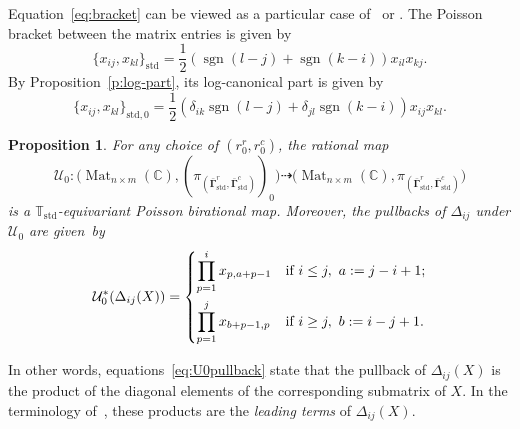 \documentclass[11pt]{article}
\newcommand{\bbg}{\bar{\mathbf{\Gamma}}}
\newcommand{\std}{\mathrm{std}}
\DeclareMathOperator{\Mat}{Mat}
\DeclareMathOperator{\sgn}{sgn}
\newtheorem{proposition}[theorem]{Proposition}%
\theoremstyle{definition}\newtheorem{definition}[theorem]{Definition}
\theoremstyle{definition}\newtheorem{remark}[theorem]{Remark}
\theoremstyle{remark}
\numberwithin{equation}{section}
\begin{document}
Equation~\eqref{eq:bracket} can be viewed as a particular case of~\cite[Proposition 5.8]{gy-cgl} or \cite[Proposition 4.19]{gsv-book}. The Poisson bracket between the matrix entries is given by
\begin{equation*}
    \{x_{ij},x_{kl}\}_{\std} = \frac{1}{2}(\sgn(l-j)+\sgn(k-i))x_{il}x_{kj}.
\end{equation*}
By Proposition~\ref{p:log-part}, its log-canonical part is given by
\begin{equation}\label{eq:std0xij}
    \{x_{ij},x_{kl}\}_{\std,0} = \frac{1}{2}(\delta_{ik}\sgn(l-j)+\delta_{jl}\sgn(k-i))x_{ij}x_{kl}.
\end{equation}
\begin{proposition}\label{p:U0}
    For any choice of $(r_0^r,r_0^c)$, the rational map
    \begin{equation*}
        \mathcal{U}_0 : \big(\Mat_{n\times m}(\mathbb{C}),(\pi_{(\bbg^r_{\std},\bbg^c_{\std})})_0 \big)\dashrightarrow \big(\Mat_{n\times m}(\mathbb{C}),\pi_{(\bbg^r_{\std},\bbg^c_{\std})}\big)
    \end{equation*}
    is a $\mathbb{T}_{\std}$-equivariant Poisson birational map. Moreover, the pullbacks of $\Delta_{ij}$ under $\mathcal{U}_0$ are given~by
    \begin{equation}\label{eq:U0pullback}
        \mathcal{U}_0^*(\Delta_{ij}(X)) = \begin{dcases}
            \prod_{p=1}^i x_{p,a+p-1} &\text{if} \ i \leq j, \ a := j-i+1;\\
            \prod_{p=1}^j x_{b+p-1,p} &\text{if} \ i \geq j, \ b := i-j+1.
        \end{dcases}
    \end{equation}
\end{proposition}
In other words, equations~\eqref{eq:U0pullback} state that the pullback of $\Delta_{ij}(X)$ is the product of the diagonal elements of the corresponding submatrix of $X$. In the terminology of~\cite{gy-cgl}, these products are the \emph{leading terms} of $\Delta_{ij}(X)$.
\end{document}
